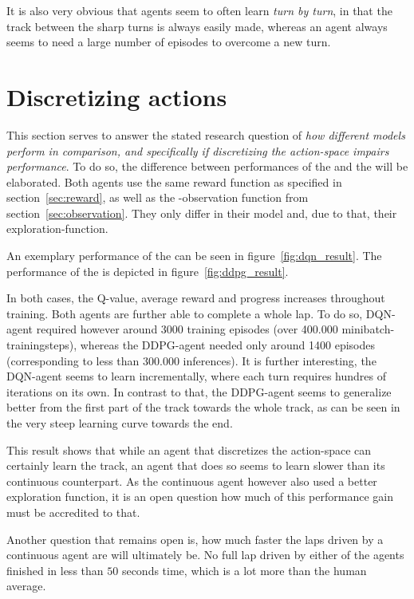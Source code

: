 It is also very obvious that agents seem to often learn \textit{turn by turn}, in that the track between the sharp turns is always easily made, whereas an agent always seems to need a large number of episodes to overcome a new turn.

\section{Discretizing actions}

This section serves to answer the stated research question of \textit{how different models perform in comparison, and specifically if discretizing the action-space impairs performance}. To do so, the difference between performances of the  and the  will be elaborated.
Both agents use the same reward function as specified in section~\ref{sec:reward}, as well as the -observation function from section~\ref{sec:observation}. They only differ in their model and, due to that, their exploration-function.

An exemplary performance of the  can be seen in figure~\ref{fig:dqn_result}. The performance of the  is depicted in figure~\ref{fig:ddpg_result}.

In both cases, the Q-value, average reward and progress increases throughout training. Both agents are further able to complete a whole lap. To do so, DQN-agent required however around 3000 training episodes (over 400.000 minibatch-trainingsteps), whereas the DDPG-agent needed only around 1400 episodes (corresponding to less than 300.000 inferences). It is further interesting, the DQN-agent seems to learn incrementally, where each turn requires hundres of iterations on its own. In contrast to that, the DDPG-agent seems to generalize better from the first part of the track towards the whole track, as can be seen in the very steep learning curve towards the end.

This result shows that while an agent that discretizes the action-space can certainly learn the track, an agent that does so seems to learn slower than its continuous counterpart. As the continuous agent however also used a better exploration function, it is an open question how much of this performance gain must be accredited to that. 

Another question that remains open is, how much faster the laps driven by a continuous agent are will ultimately be. No full lap driven by either of the agents finished in less than $50$ seconds time, which is a lot more than the human average. 

